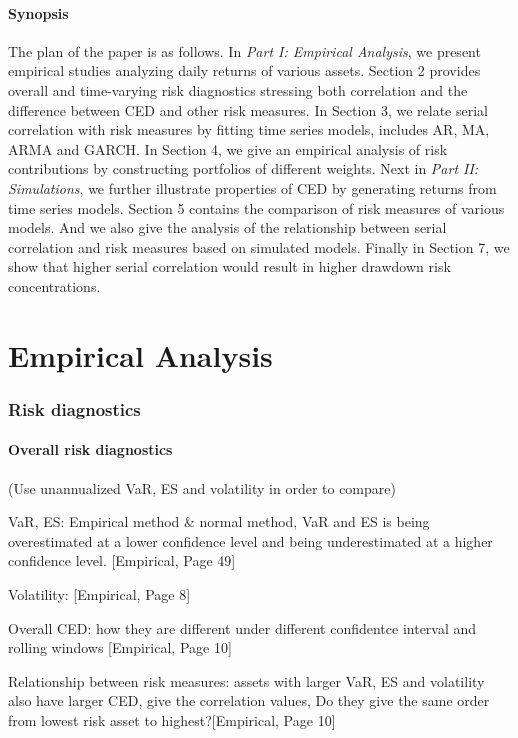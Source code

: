 \documentclass[11pt]{article}
\begin{document}
\subsection{Synopsis}

The plan of the paper is as follows. In \emph{Part I: Empirical Analysis}, we present empirical studies analyzing daily returns of various assets. Section 2 provides overall and time-varying risk diagnostics stressing both correlation and the difference between CED and other risk measures. In Section 3, we relate serial correlation with risk measures by fitting time series models, includes AR, MA, ARMA and GARCH. In Section 4, we give an empirical analysis of risk contributions by constructing portfolios of different weights. Next in \emph{Part II: Simulations}, we further illustrate properties of CED by generating returns from time series models. Section 5 contains the comparison of risk measures of various models. And we also give the analysis of the relationship between serial correlation and risk measures based on simulated models. Finally in Section 7, we show that higher serial correlation would result in higher drawdown risk concentrations.

\part{Empirical Analysis}

\section{Risk diagnostics}

\subsection{Overall risk diagnostics}

(Use unannualized VaR, ES and volatility in order to compare)

VaR, ES: Empirical method \& normal method, VaR and ES is being overestimated at a lower confidence level and being underestimated at a higher confidence level. [Empirical, Page 49]

Volatility: [Empirical, Page 8]

Overall CED: how they are different under different confidentce interval and rolling windows [Empirical, Page 10]

Relationship between risk measures: assets with larger VaR, ES and volatility also have larger CED, give the correlation values, Do they give the same order from lowest risk asset to highest?[Empirical, Page 10]
\end{document}

